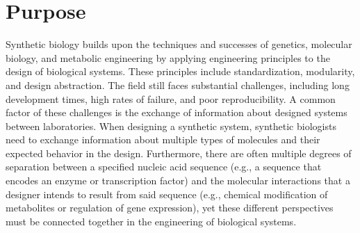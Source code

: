 \section{Purpose}


Synthetic biology builds upon the techniques and successes of genetics, molecular biology, and metabolic engineering by applying engineering principles to the design of biological systems. These principles include standardization, modularity, and design abstraction. The field still faces substantial challenges, including long development times, high rates of failure, and poor reproducibility. A common factor of these challenges is the exchange of information about designed systems between laboratories. 
When designing a synthetic system, synthetic biologists need to exchange information about multiple types of molecules and their expected behavior in the design.
Furthermore, there are often multiple degrees of separation between a specified nucleic acid sequence (e.g., a sequence that encodes an enzyme or transcription factor) and the molecular interactions that a designer intends to result from said sequence (e.g., chemical modification of metabolites or regulation of gene expression), yet these different perspectives must be connected together in the engineering of biological systems.

